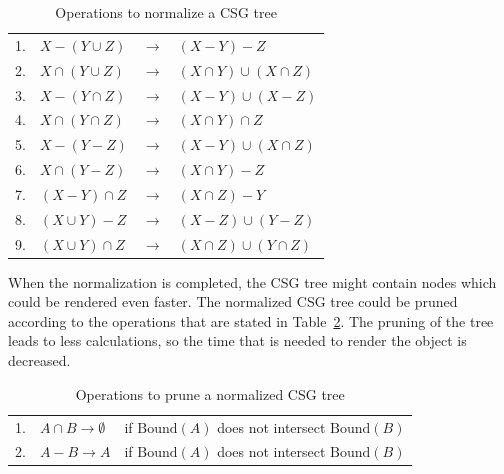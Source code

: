\documentclass[a4paper,10pt,twocolumn]{article}
\newcommand{\Bound}{\mbox{Bound}}
\begin{document}
    \begin{table}[h]
        \begin{tabular}{llll}
            1. & $X - (Y \cup Z)$    & $\rightarrow$ & $(X - Y) - Z$\\
            2. & $X \cap (Y \cup Z)$ & $\rightarrow$ & $(X \cap Y) \cup (X \cap Z)$\\
            3. & $X - (Y \cap Z)$    & $\rightarrow$ & $(X - Y) \cup (X - Z)$\\
            4. & $X \cap (Y \cap Z)$ & $\rightarrow$ & $(X \cap Y) \cap Z$\\
            5. & $X - (Y - Z)$       & $\rightarrow$ & $(X - Y) \cup (X \cap Z)$\\
            6. & $X \cap (Y - Z)$    & $\rightarrow$ & $(X \cap Y) - Z$\\
            7. & $(X - Y) \cap Z$    & $\rightarrow$ & $(X \cap Z) - Y$\\
            8. & $(X \cup Y) - Z$    & $\rightarrow$ & $(X - Z) \cup (Y - Z)$\\
            9. & $(X \cup Y) \cap Z$ & $\rightarrow$ & $(X \cap Z) \cup (Y \cap Z)$\\
        \end{tabular}
        \caption{Operations to normalize a CSG tree}
        \label{table:normalize}
    \end{table}

    When the normalization is completed, the CSG tree might contain nodes which could be rendered even faster. The normalized CSG tree could be pruned according to the operations that are stated in Table~\ref{table:prune}. The pruning of the tree leads to less calculations, so the time that is needed to render the object is decreased.\\

    \begin{table}[h]
        \hspace{-0.8em}
        \begin{tabular}{p{} p{} p{} }
            1. & $A \cap B \rightarrow \emptyset$ & if $\Bound(A)$ does not intersect $\Bound(B)$\\
            2. & $A - B \rightarrow A$            & if $\Bound(A)$ does not intersect $\Bound(B)$\\
        \end{tabular}
        \caption{Operations to prune a normalized CSG tree}
        \label{table:prune}
    \end{table}
\end{document}
